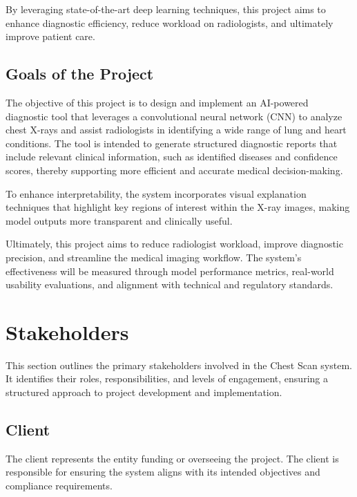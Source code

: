 \documentclass[12pt]{article}
\begin{document}
By leveraging state-of-the-art deep learning techniques, this project aims to enhance diagnostic efficiency, reduce workload on radiologists, and ultimately improve patient care.

\subsection{Goals of the Project}
The objective of this project is to design and implement an AI-powered diagnostic tool that leverages a convolutional neural network (CNN) to analyze chest X-rays and assist radiologists in identifying a wide range of lung and heart conditions. The tool is intended to generate structured diagnostic reports that include relevant clinical information, such as identified diseases and confidence scores, thereby supporting more efficient and accurate medical decision-making.

To enhance interpretability, the system incorporates visual explanation techniques that highlight key regions of interest within the X-ray images, making model outputs more transparent and clinically useful.

Ultimately, this project aims to reduce radiologist workload, improve diagnostic precision, and streamline the medical imaging workflow. The system's effectiveness will be measured through model performance metrics, real-world usability evaluations, and alignment with technical and regulatory standards.

\section{Stakeholders}

This section outlines the primary stakeholders involved in the Chest Scan system. It identifies their roles, responsibilities, and levels of engagement, ensuring a structured approach to project development and implementation.

\subsection{Client}
The client represents the entity funding or overseeing the project. The client is responsible for ensuring the system aligns with its intended objectives and compliance requirements.
\end{document}
